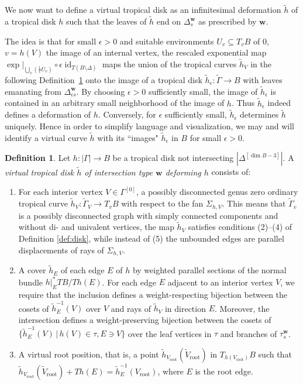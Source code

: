 \documentclass[11pt,letter]{amsart}
\theoremstyle{definition}
\newtheorem{definition}[theorem]{Definition}
\theoremstyle{remark}
\numberwithin{equation}{section}
\numberwithin{figure}{section}
\newcommand{\cover}{\tau^{\mathbf w}_s}
\newcommand{\Cover}{\Delta^{\mathbf w}_{s} }
\newcommand {\id}  {\operatorname{id}}
\newcommand {\rootvertex}  {V_{\mathrm{root}}}
\begin{document}
We now want to define a virtual tropical disk as an infinitesimal deformation
$\tilde h$ of a tropical disk $h$ such that the leaves of $\tilde h$ end on
$\Cover$ as prescribed by $\mathbf w$.

The idea is that for small $\epsilon>0$ and suitable environments $ U_v\subseteq
T_vB$ of $0$, $v=h(V)$ the image of an internal vertex, the rescaled exponential
map $\exp\big|_{\bigcup_v \left(\frac1\epsilon U_v\right)} \circ \epsilon
\id_{T(B\setminus \Delta)}$ maps the union of the tropical curves $\tilde h_V$
in the following Definition~\ref{Def: virtual tropical disk} onto the image of a
tropical disk $\tilde h_\epsilon: \tilde \Gamma \to B$ with leaves emanating
from $ \Delta_{\epsilon s}^{\mathbf w} $. By choosing $\epsilon>0$ sufficiently
small, the image of $\tilde h_\epsilon$ is contained in an arbitrary small
neighborhood of the image of $h$. Thus $\tilde h_\epsilon$ indeed defines a
deformation of $h$. Conversely, for $\epsilon$ sufficiently small, $\tilde
h_\epsilon$ determines $\tilde h$ uniquely. Hence in order to simplify language
and visualization, we may and will identify a virtual curve $\tilde h$ with its
``images" $\tilde h_\epsilon$ in $B$ for small $\epsilon>0$.

\begin{definition}
\label{Def: virtual tropical disk}
Let $h: |\Gamma|\to B$ be a tropical disk not intersecting $|\Delta^{[\dim
B-3]}|$. A \emph{virtual tropical disk $\tilde h$ of intersection type $\mathbf
w$ deforming $h$} consists of:
\begin{enumerate}
\item
For each interior vertex $V\in\Gamma^{[0]}$, a possibly disconnected genus zero
ordinary tropical curve $\tilde h_V: \tilde \Gamma_V \to T_vB$ with respect to
the fan $\Sigma_{h,V}$. This means that $\tilde \Gamma_v$ is a possibly
disconnected graph with simply connected components and without di- and
univalent vertices, the map $\tilde h_V$ satisfies conditions (2)--(4) of
Definition \ref{def:disk}, while instead of (5) the unbounded edges are parallel
displacements of rays of $\Sigma_{h,V}$.
\item
A cover $\tilde h_E$ of each edge $E$ of $h$ by weighted parallel sections of
the normal bundle $h|_E^*TB/Th(E)$. For each edge $E$ adjacent to an interior
vertex $V$, we require that the inclusion defines a weight-respecting bijection
between the cosets of $\tilde h_E^{-1}(V)$ over $V$ and rays of $\tilde h_V$ in
direction $E$. Moreover, the intersection defines a weight-preserving bijection
between the cosets of $\{ \tilde h_E^{-1}(V) \, | \, h( V)\in \tau, E\ni V \}$
over the leaf vertices in $\tau$ and branches of $\cover$.
\item
A virtual root position, that is, a point $\tilde h_{\rootvertex}
(\widetilde\rootvertex)$ in $T_{h(\rootvertex)}B$ such that $\tilde
h_{\rootvertex}(\widetilde\rootvertex) + Th(E) = \tilde h_E^{-1}({\rootvertex})$, where $E$ is
the root edge.
\end{enumerate}
\end{definition}
\end{document}
